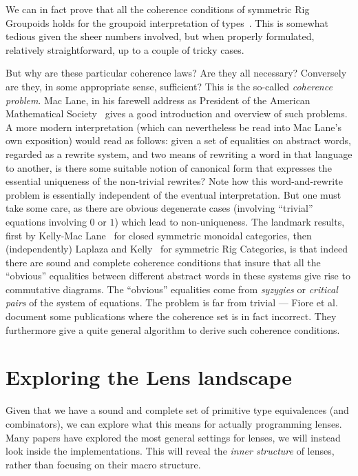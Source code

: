 \documentclass[sigplan,review,anonymous]{acmart}
\begin{document}
We can in fact prove that all the coherence conditions
of symmetric Rig Groupoids holds for the groupoid
interpretation of types~\cite{Carette2016}.  This is somewhat tedious
given the sheer numbers involved, but when properly formulated,
relatively straightforward, up to a couple of tricky cases.

But why are these particular coherence laws? Are they all necessary?
Conversely are they, in some appropriate sense, sufficient? This is
the so-called \emph{coherence problem}. Mac Lane, in his farewell address
as President of the American Mathematical Society~\cite{MacLane1976} gives
a good introduction and overview of such problems.  A more modern
interpretation (which can nevertheless be read into Mac Lane's own
exposition) would read as follows: given a set of equalities on abstract
words, regarded as a rewrite system, and two means of rewriting a word
in that language to another, is there some suitable notion of canonical
form that expresses the essential uniqueness of the non-trivial
rewrites?  Note how this word-and-rewrite problem is essentially
independent of the eventual interpretation. But one must take some care,
as there are obvious degenerate cases (involving ``trivial'' equations
involving $0$ or $1$) which lead to non-uniqueness. The landmark
results, first by Kelly-Mac Lane~\cite{KELLY197197} for closed
symmetric monoidal categories, then (independently) Laplaza and
Kelly~\cite{laplaza72,kelly74} for symmetric Rig Categories, is
that indeed there are sound and complete coherence conditions that
insure that all the ``obvious'' equalities between different abstract
words in these systems give rise to commutative diagrams. The
``obvious'' equalities come from \emph{syzygies} or
\emph{critical pairs} of the system of equations.
The problem is far from trivial --- Fiore et al.~\cite{Fiore-2008}
document some publications where the coherence set is in
fact incorrect. They furthermore give a quite general algorithm
to derive such coherence conditions.

\section{Exploring the Lens landscape}

Given that we have a sound and complete set of primitive type equivalences
(and combinators),
we can explore what this means for actually programming lenses. Many papers
have explored the most general settings for lenses, we will instead look
inside the implementations.  This will
reveal the \emph{inner structure} of lenses, rather than focusing on their
macro structure.
\end{document}
